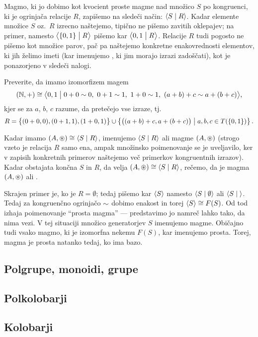Magmo, ki jo dobimo kot kvocient proste magme nad množico $S$ po kongruenci, ki je ogrinjača relacije $R$, zapišemo na sledeči način: $\pres{S}{R}$. Kadar elemente množice $S$ oz.~$R$ izrecno naštejemo, tipično ne pišemo zavitih oklepajev; na primer, namesto $\pres[1]{\set{0, 1}}{R}$ pišemo kar $\pres[1]{0, 1}{R}$. Relacije $R$ tudi pogosto ne pišemo kot množice parov, pač pa naštejemo konkretne enakovrednosti elementov, ki jih želimo imeti (kar imenujemo , ki jim morajo izrazi zadoščati), kot je ponazorjeno v sledeči nalogi.

\begin{naloga}
Preverite, da imamo izomorfizem magem
\[(\NN, +) \ism \pres[1]{0, 1}{0 + 0 \equ 0,\ 0 + 1 \equ 1,\ 1 + 0 \equ 1,\ (a + b) + c \equ a + (b + c)},\]
kjer se za $a$, $b$, $c$ razume, da pretečejo vse izraze, tj.
\[R = \set[1]{(0 + 0, 0), (0 + 1, 1), (1 + 0, 1)} \cup \set{\big((a + b) + c, a + (b + c)\big)}{a, b, c \in T(\set{0, 1})}.\]
\end{naloga}

Kadar imamo $(A, \oper) \ism \pres{S}{R}$, imenujemo $\pres{S}{R}$  ali  magme $(A, \mathop{\circledast}\nolimits)$  (strogo vzeto je relacija $R$ samo ena, ampak množinsko poimenovanje se je uveljavilo, ker v zapisih konkretnih primerov naštejemo več primerkov kongruentnih izrazov). Kadar obstajata končna $S$ in $R$, da velja $(A, \oper) \ism \pres{S}{R}$, rečemo, da je magma $(A, \mathop{\circledast}\nolimits)$  ali .

Skrajen primer je, ko je $R = \emptyset$; tedaj pišemo kar $\pres{S}$ namesto $\pres{S}{\emptyset}$ ali $\pres{S}{ }$. Tedaj za kongruenčno ogrinjačo $\sim$ dobimo enakost in torej $\pres{S} \ism F(S)$. Od tod izhaja poimenovanje ``prosta magma'' --- predstavimo jo namreč lahko tako, da nima vezi. V tej situaciji množico generatorjev $S$ imenujemo  magme. Običajno tudi vsako magmo, ki je izomorfna nekemu $F(S)$, kar imenujemo prosta. Torej, magma je prosta natanko tedaj, ko ima bazo.

\subsection{Polgrupe, monoidi, grupe}
\subsection{Polkolobarji}
\subsection{Kolobarji}
